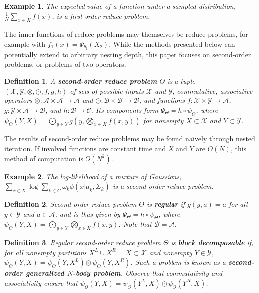 \documentclass{article}
\newtheorem{definition} {Definition}
\newtheorem{example} {Example}
\newcommand{\killspace}{\vspace{-0.08in}}
\newcommand{\GNP}[1][\psi]{{#1}_{\Theta}}
\newcommand{\comp}{\mathbin{\circ}}
\newcommand{\kdleft}[1]{#1^{\!L}}
\newcommand{\kdright}[1]{#1^{\!R}}
\begin{document}
\begin{example}
  The expected value of a function under a sampled distribution,
  $\frac{1}{N} \sum_{x \in X} f(x)$, is a first-order reduce problem.
\end{example}
\killspace
The inner functions of reduce problems may themselves be reduce
problems, for example with $f_1(x) = \Psi_{\theta_2}(X_2)$.  While the
methods presented below can potentially extend to arbitrary nesting
depth, this paper focuses on second-order problems, or problems of two
operators.
\begin{definition}
  A {\bf second-order reduce problem} $\Theta$ is a tuple
  $(\mathcal{X},\mathcal{Y},\otimes,\odot,f,g,h)$ of sets of possible
  inputs $\mathcal{X}$ and $\mathcal{Y}$, commutative, associative
  operators $\otimes \colon \mathcal{A} \times \mathcal{A} \to
  \mathcal{A}$ and $\odot \colon \mathcal{B} \times \mathcal{B} \to
  \mathcal{B}$, and functions $f \colon \mathcal{X} \times \mathcal{Y}
  \to \mathcal{A}$, $g \colon \mathcal{Y} \times \mathcal{A} \to
  \mathcal{B}$, and $h \colon \mathcal{B} \to \mathcal{C}$.  Its
  components form $\Psi_{\Theta} = h \comp \psi_{\Theta}$, where
  $\psi_{\Theta}(Y,X) = \bigodot_{y \in Y} g \left( y,\bigotimes_{x
  \in X} f(x,y) \right)$ for nonempty $X \subset \mathcal{X}$ and $Y
  \subset \mathcal{Y}$.
\end{definition}
\killspace
\noindent The results of second-order reduce problems may be found
na\"{\i}vely through nested iteration.  If involved functions are
constant time and $X$ and $Y$ are $O(N)$, this method of computation
is $O(N^2)$.
\begin{example}
  The log-likelihood of a mixture of Gaussians, $\sum_{x \in X} \log
  \sum_{k \in C} \omega_k \phi(x | \mu_k, \Sigma_k)$ is a second-order
  reduce problem.
\end{example}
\begin{definition}
  Second-order reduce problem $\Theta$ is {\bf regular} if $g(y,a) =
  a$ for all $y \in \mathcal{Y}$ and $a \in \mathcal{A}$, and is thus
  given by $\Psi_{\Theta} = h \comp \psi_{\Theta}$, where
  $\psi_{\Theta}(Y,X) = \bigodot_{y \in Y} \bigotimes_{x \in X}
  f(x,y)$.  Note that $\mathcal{B} = \mathcal{A}$.
\end{definition}
\begin{definition}
  Regular second-order reduce problem $\Theta$ is {\bf block
  decomposable} if, for all nonempty partitions $\kdleft{X} \cup \kdright{X}
  = X \subset \mathcal{X}$ and nonempty $Y \in \mathcal{Y}$,
  $\GNP(Y,X) = \GNP(Y,\kdleft{X}) \otimes \GNP(Y,\kdright{X})$.  Such a
  problem is known
  as a {\bf second-order generalized $N$-body problem}.
  Observe that commutativity and associativity ensure
  that $\GNP(Y,X) = \GNP(\kdleft{Y},X) \odot \GNP(\kdright{Y},X)$.
\end{definition}
\end{document}
